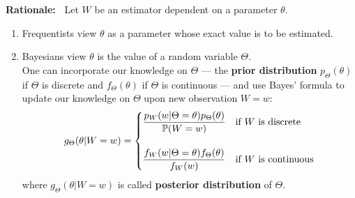 \begin{frame}

{\bf Rationale:~} Let $W$ be an estimator dependent on a parameter $\theta$.
\begin{enumerate}
 \item Frequentists view $\theta$ as a parameter whose exact value is to be estimated.\\[1em]
 \item Bayesians view $\theta$ is the value of a random variable $\Theta$. \\[1em]
 \pause
 One can incorporate our knowledge on $\Theta$ --- the {\bf prior distribution} $p_\Theta(\theta)$ if $\Theta$ is discrete and $f_\Theta(\theta)$ if $\Theta$ is continuous --- and use Bayes' formula to update our knowledge on $\Theta$ upon new observation $W=w$:
\begin{align*}
g_\Theta(\theta|W=w)=
\begin{cases}
 \displaystyle \frac{p_W(w|\Theta=\theta) p_\Theta(\theta)}{\mathbb{P}(W=w)} & \text{if $W$ is discrete} \\[2em]
 \displaystyle \frac{f_W(w|\Theta=\theta) f_\Theta(\theta)}{f_W(w)}   & \text{if $W$ is continuous}
\end{cases}
 \end{align*}
 where $g_\Theta(\theta|W=w)$ is called {\bf posterior distribution} of $\Theta$.
\end{enumerate}
\end{frame}
